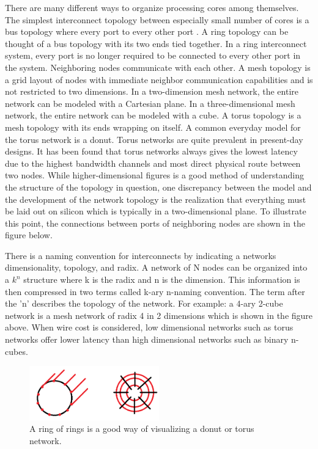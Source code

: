 \documentclass[letterpaper, 10 pt, conference]{ieeeconf}
\begin{document}
There are many different ways to organize processing cores among themselves.  The simplest interconnect topology between especially small number of cores is a bus topology where every port to every other port .  A ring topology can be thought of a bus topology with its two ends tied together. In a ring interconnect system, every port is no longer required to be connected to every other port in the system.  Neighboring nodes communicate with each other.  A mesh topology is a grid layout of nodes with immediate neighbor communication capabilities and is not restricted to two dimensions.  In a two-dimension mesh network, the entire network can be modeled with a Cartesian plane.  In a three-dimensional mesh network, the entire network can be modeled with a cube.  A torus topology is a mesh topology with its ends wrapping on itself.  A common everyday model for the torus network is a donut.  Torus networks are quite prevalent in present-day designs.  It has been found that torus networks always gives the lowest latency due to the highest bandwidth channels and most direct physical route between two nodes.  While higher-dimensional figures is a good method of understanding the structure of the topology in question, one discrepancy between the model and the development of the network topology is the realization that everything must be laid out on silicon which is typically in a two-dimensional plane.  To illustrate this point, the connections between ports of neighboring nodes are shown in the figure below.  

There is a naming convention for interconnects by indicating a networks dimensionality, topology, and radix.  A network of N nodes can be organized into a ${k}^{n}$ structure where k is the radix and n is the dimension.  This information is then compressed in two terms called k-ary n-naming convention.  The term after the 'n' describes the topology of the network.  For example: a 4-ary 2-cube network is a mesh network of radix 4 in 2 dimensions which is shown in the figure above.  When wire cost is considered, low dimensional networks such as torus networks offer lower latency than high dimensional networks such as binary n-cubes.

\begin{figure}[!ht] %
	\centering
	\includegraphics [width=0.5\textwidth] {Torus.png} 
    \caption{A ring of rings is a good way of visualizing a donut or torus network.}
\end{figure}
\end{document}
